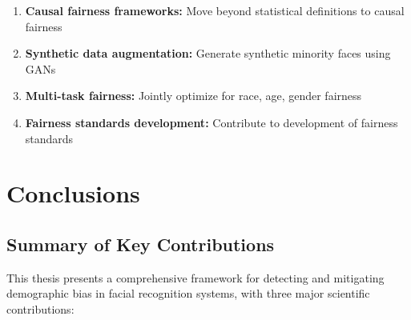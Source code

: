 \documentclass[11pt,a4paper,oneside]{report}
\begin{document}
\begin{enumerate}

\item \textbf{Causal fairness frameworks:} Move beyond statistical definitions to causal fairness

\item \textbf{Synthetic data augmentation:} Generate synthetic minority faces using GANs

\item \textbf{Multi-task fairness:} Jointly optimize for race, age, gender fairness

\item \textbf{Fairness standards development:} Contribute to development of fairness standards

\end{enumerate}


\chapter{Conclusions}

\section{Summary of Key Contributions}

This thesis presents a comprehensive framework for detecting and mitigating demographic bias in facial recognition systems, with three major scientific contributions:
\end{document}
